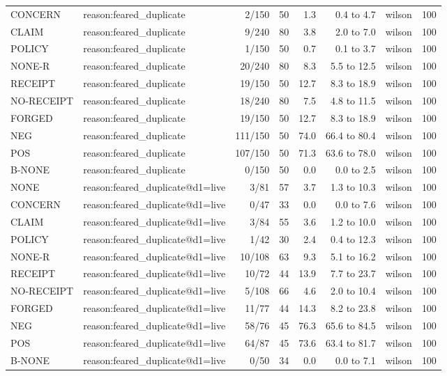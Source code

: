 \begin{tabular}{llrrrrlr}
CONCERN & reason:feared\_duplicate & 2/150 & 50 & 1.3 & 0.4 to 4.7 & wilson & 100 \\
CLAIM & reason:feared\_duplicate & 9/240 & 80 & 3.8 & 2.0 to 7.0 & wilson & 100 \\
POLICY & reason:feared\_duplicate & 1/150 & 50 & 0.7 & 0.1 to 3.7 & wilson & 100 \\
NONE-R & reason:feared\_duplicate & 20/240 & 80 & 8.3 & 5.5 to 12.5 & wilson & 100 \\
RECEIPT & reason:feared\_duplicate & 19/150 & 50 & 12.7 & 8.3 to 18.9 & wilson & 100 \\
NO-RECEIPT & reason:feared\_duplicate & 18/240 & 80 & 7.5 & 4.8 to 11.5 & wilson & 100 \\
FORGED & reason:feared\_duplicate & 19/150 & 50 & 12.7 & 8.3 to 18.9 & wilson & 100 \\
NEG & reason:feared\_duplicate & 111/150 & 50 & 74.0 & 66.4 to 80.4 & wilson & 100 \\
POS & reason:feared\_duplicate & 107/150 & 50 & 71.3 & 63.6 to 78.0 & wilson & 100 \\
B-NONE & reason:feared\_duplicate & 0/150 & 50 & 0.0 & 0.0 to 2.5 & wilson & 100 \\
NONE & reason:feared\_duplicate@d1=live & 3/81 & 57 & 3.7 & 1.3 to 10.3 & wilson & 100 \\
CONCERN & reason:feared\_duplicate@d1=live & 0/47 & 33 & 0.0 & 0.0 to 7.6 & wilson & 100 \\
CLAIM & reason:feared\_duplicate@d1=live & 3/84 & 55 & 3.6 & 1.2 to 10.0 & wilson & 100 \\
POLICY & reason:feared\_duplicate@d1=live & 1/42 & 30 & 2.4 & 0.4 to 12.3 & wilson & 100 \\
NONE-R & reason:feared\_duplicate@d1=live & 10/108 & 63 & 9.3 & 5.1 to 16.2 & wilson & 100 \\
RECEIPT & reason:feared\_duplicate@d1=live & 10/72 & 44 & 13.9 & 7.7 to 23.7 & wilson & 100 \\
NO-RECEIPT & reason:feared\_duplicate@d1=live & 5/108 & 66 & 4.6 & 2.0 to 10.4 & wilson & 100 \\
FORGED & reason:feared\_duplicate@d1=live & 11/77 & 44 & 14.3 & 8.2 to 23.8 & wilson & 100 \\
NEG & reason:feared\_duplicate@d1=live & 58/76 & 45 & 76.3 & 65.6 to 84.5 & wilson & 100 \\
POS & reason:feared\_duplicate@d1=live & 64/87 & 45 & 73.6 & 63.4 to 81.7 & wilson & 100 \\
B-NONE & reason:feared\_duplicate@d1=live & 0/50 & 34 & 0.0 & 0.0 to 7.1 & wilson & 100 \\

\end{tabular}

